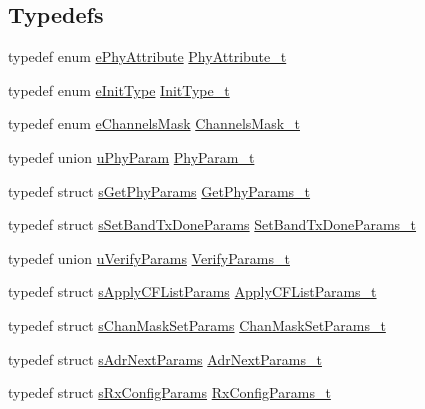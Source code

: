 \subsection*{Typedefs}
\begin{DoxyCompactItemize}
\item 
typedef enum \hyperlink{group__REGION_ga51cbe8f5433d914fe9cf81b451de2c2d}{e\+Phy\+Attribute} \hyperlink{group__REGION_ga9445b07fdf77581ecfaf389970e635f8}{Phy\+Attribute\+\_\+t}
\item 
typedef enum \hyperlink{group__REGION_ga11ecad794560a3d3961bdf1c9a27d3b2}{e\+Init\+Type} \hyperlink{group__REGION_gaddc73ae10673ec925724e7870363bda9}{Init\+Type\+\_\+t}
\item 
typedef enum \hyperlink{group__REGION_ga7a62e669f567fc160ad58210664bca9c}{e\+Channels\+Mask} \hyperlink{group__REGION_ga933f695eea70935418e2175940b92311}{Channels\+Mask\+\_\+t}
\item 
typedef union \hyperlink{unionuPhyParam}{u\+Phy\+Param} \hyperlink{group__REGION_gaed159b26e5c4677236b6e8677019db30}{Phy\+Param\+\_\+t}
\item 
typedef struct \hyperlink{structsGetPhyParams}{s\+Get\+Phy\+Params} \hyperlink{group__REGION_gab471483fff904f4f89bbc03f7fc380ab}{Get\+Phy\+Params\+\_\+t}
\item 
typedef struct \hyperlink{structsSetBandTxDoneParams}{s\+Set\+Band\+Tx\+Done\+Params} \hyperlink{group__REGION_gad0524aa0673c0814a71e7a4f9cade3fc}{Set\+Band\+Tx\+Done\+Params\+\_\+t}
\item 
typedef union \hyperlink{unionuVerifyParams}{u\+Verify\+Params} \hyperlink{group__REGION_ga966d97bc2f25df1c09e92e60ef652276}{Verify\+Params\+\_\+t}
\item 
typedef struct \hyperlink{structsApplyCFListParams}{s\+Apply\+C\+F\+List\+Params} \hyperlink{group__REGION_ga71588e9ad07e34b78fa91d51881fd3c6}{Apply\+C\+F\+List\+Params\+\_\+t}
\item 
typedef struct \hyperlink{structsChanMaskSetParams}{s\+Chan\+Mask\+Set\+Params} \hyperlink{group__REGION_ga6d24f7da136006410827dfb29f6b9b9e}{Chan\+Mask\+Set\+Params\+\_\+t}
\item 
typedef struct \hyperlink{structsAdrNextParams}{s\+Adr\+Next\+Params} \hyperlink{group__REGION_ga567c2742622326b350b4e91bbf61b4ce}{Adr\+Next\+Params\+\_\+t}
\item 
typedef struct \hyperlink{structsRxConfigParams}{s\+Rx\+Config\+Params} \hyperlink{group__REGION_ga375c038078dfcfc7ef14280021db719e}{Rx\+Config\+Params\+\_\+t}
\item 

\end{DoxyCompactItemize}
